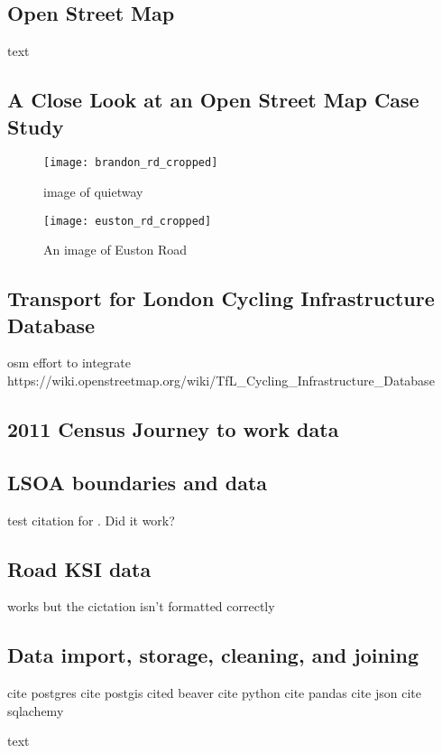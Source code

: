 \subsection{Open Street Map}

text

\cite{osm}

\subsection{A Close Look at an Open Street Map Case Study}

\begin{figure}
\centering
\texttt{[image: brandon\_rd\_cropped]}
\caption{image of quietway}
\end{figure}

\begin{figure}
\centering
\texttt{[image: euston\_rd\_cropped]}
\caption{An image of Euston Road}
\label{fig:euston}
\end{figure}

\subsection{Transport for London Cycling Infrastructure Database}

\cite{tflcid}

osm effort to integrate
https://wiki.openstreetmap.org/wiki/TfL_Cycling_Infrastructure_Database

\subsection{2011 Census Journey to work data}

\cite{jtw}

\subsection{LSOA boundaries and data}
	
test citation for \cite{lsoageoms}. Did it work?
	
\subsection{Road KSI data}
	
	
	works but the cictation isn't formatted correctly
	\cite{cyclistksi}
	
\subsection{Data import, storage, cleaning, and joining}

cite postgres
cite postgis
cited beaver
cite python
cite pandas
cite json
cite sqlachemy

text